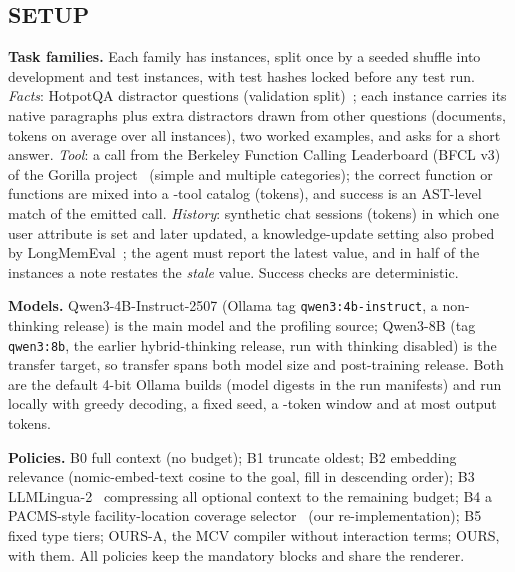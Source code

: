 \subsection{SETUP}
\textbf{Task families.} Each family has \RNPerFamily instances, split once by a seeded shuffle into \RNDev development
and \RNTest test instances, with test hashes locked before any test run. \emph{Facts}: HotpotQA distractor questions
(validation split)~\cite{hotpotqa2018}; each instance carries its native paragraphs plus extra distractors drawn from other
questions (\RNumDocs documents, \RFullTokFacts tokens on average over all instances), two worked examples, and asks for a short answer.
\emph{Tool}: a call from the Berkeley Function Calling Leaderboard (BFCL v3) of the Gorilla project~\cite{gorilla2023} (simple and multiple categories); the
correct function or functions are mixed into a \RNumTools-tool catalog (\RFullTokTool tokens), and success is an
AST-level match of the emitted call. \emph{History}: \RNumSessions synthetic chat sessions (\RFullTokHistory tokens)
in which one user attribute is set and later updated, a knowledge-update setting also probed by
LongMemEval~\cite{longmemeval2024}; the agent must report the latest value, and in half of the
instances a note restates the \emph{stale} value. Success checks are deterministic.

\textbf{Models.} Qwen3-4B-Instruct-2507 (Ollama tag \texttt{qwen3:4b-instruct}, a non-thinking release) is the main
model and the profiling source; Qwen3-8B (tag \texttt{qwen3:8b}, the earlier hybrid-thinking release, run with thinking
disabled) is the transfer target, so transfer spans both model size and post-training release. Both are the default
4-bit Ollama builds (model digests in the run manifests) and run locally with greedy decoding, a fixed seed, a
\RNumCtx-token window and at most \RNumPredict output tokens.

\textbf{Policies.} B0 full context (no budget); B1 truncate oldest; B2 embedding relevance (nomic-embed-text cosine to
the goal, fill in descending order); B3 LLMLingua-2~\cite{llmlingua2_2024} compressing all optional context to the
remaining budget; B4 a PACMS-style facility-location coverage selector~\cite{pacms2026} (our re-implementation); B5 fixed
type tiers; OURS-A, the MCV compiler without interaction terms; OURS, with them. All policies keep the mandatory blocks
and share the renderer.

